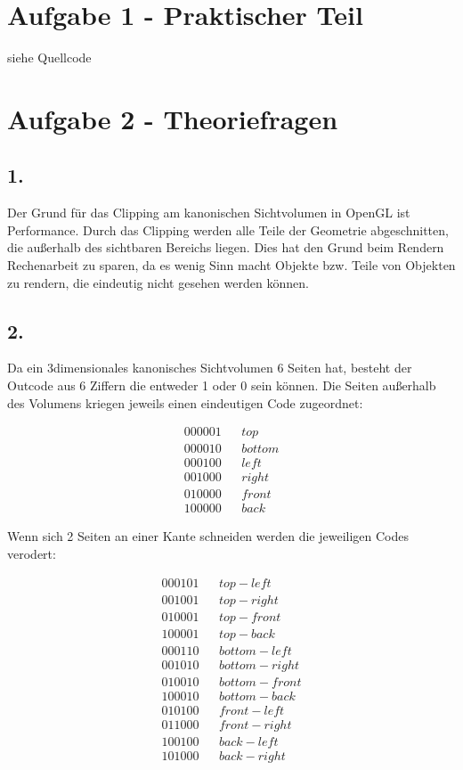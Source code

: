 \documentclass[12pt]{scrreprt}
\begin{document}


\chapter*{Aufgabe 1 - Praktischer Teil}

siehe Quellcode

\chapter*{Aufgabe 2 - Theoriefragen}
\section*{1.}
Der Grund für das Clipping am kanonischen Sichtvolumen in OpenGL ist Performance. Durch das Clipping werden alle Teile der Geometrie abgeschnitten, die außerhalb des sichtbaren Bereichs liegen. Dies hat den Grund beim Rendern Rechenarbeit zu sparen, da es wenig Sinn macht Objekte bzw. Teile von Objekten zu rendern, die eindeutig nicht gesehen werden können.
\section*{2.}
Da ein 3dimensionales kanonisches Sichtvolumen 6 Seiten hat, besteht der Outcode aus 6 Ziffern die entweder 1 oder 0 sein können. Die Seiten außerhalb des Volumens kriegen jeweils einen eindeutigen Code zugeordnet:

\begin{align*}
	000001& &top\\
	000010& &bottom\\
	000100& &left\\
	001000& &right\\
	010000& &front\\
	100000& &back
\end{align*}

Wenn sich 2 Seiten an einer Kante schneiden werden die jeweiligen Codes verodert:

\begin{align*}
	000101& &top-left\\
	001001& &top-right\\
	010001& &top-front\\
	100001& &top-back\\
	000110& &bottom-left\\
	001010& &bottom-right\\
	010010& &bottom-front\\
	100010& &bottom-back\\
	010100& &front-left\\
	011000& &front-right\\
	100100& &back-left\\
	101000& &back-right
\end{align*}
\end{document}
